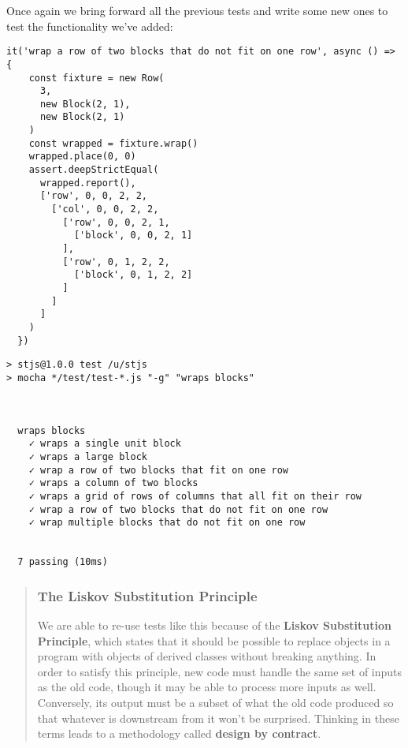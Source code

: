 \documentclass[krantzl]{krantz}
\newcommand{\glossref}[1]{\textbf{#1}}
\newenvironment{callout}{\savenotes\begin{tBox}\begin{quotation}\toggletrue{inbox}\renewcommand{\thempfootnote}{\arabic{footnote}}}{\end{quotation}\vspace{\baselineskip}\end{tBox}\togglefalse{inbox}\spewnotes}
\begin{document}
Once again we bring forward all the previous tests
and write some new ones to test the functionality we've added:


\begin{lstlisting}[frame=single,frameround=tttt]
  it('wrap a row of two blocks that do not fit on one row', async () => {
    const fixture = new Row(
      3,
      new Block(2, 1),
      new Block(2, 1)
    )
    const wrapped = fixture.wrap()
    wrapped.place(0, 0)
    assert.deepStrictEqual(
      wrapped.report(),
      ['row', 0, 0, 2, 2,
        ['col', 0, 0, 2, 2,
          ['row', 0, 0, 2, 1,
            ['block', 0, 0, 2, 1]
          ],
          ['row', 0, 1, 2, 2,
            ['block', 0, 1, 2, 2]
          ]
        ]
      ]
    )
  })
\end{lstlisting}



\begin{lstlisting}[frame=single,frameround=tttt]
> stjs@1.0.0 test /u/stjs
> mocha */test/test-*.js "-g" "wraps blocks"



  wraps blocks
    ✓ wraps a single unit block
    ✓ wraps a large block
    ✓ wrap a row of two blocks that fit on one row
    ✓ wraps a column of two blocks
    ✓ wraps a grid of rows of columns that all fit on their row
    ✓ wrap a row of two blocks that do not fit on one row
    ✓ wrap multiple blocks that do not fit on one row


  7 passing (10ms)
\end{lstlisting}


\begin{callout}


\subsubsection*{The Liskov Substitution Principle}


We are able to re-use tests like this because of
the \glossref{Liskov Substitution Principle},
which states that
it should be possible to replace objects in a program
with objects of derived classes
without breaking anything.
In order to satisfy this principle,
new code must handle the same set of inputs as the old code,
though it may be able to process more inputs as well.
Conversely,
its output must be a subset of what the old code produced
so that whatever is downstream from it won't be surprised.
Thinking in these terms leads to a methodology called
\glossref{design by contract}.

\end{callout}
\end{document}
